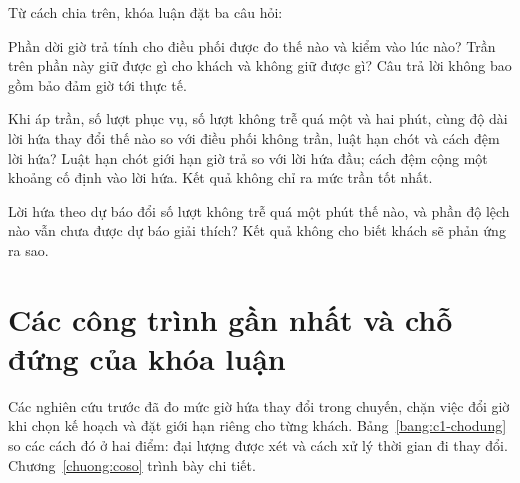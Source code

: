 Từ cách chia trên, khóa luận đặt ba câu hỏi:
\begin{description}[leftmargin=1.15cm,style=nextline,itemsep=3pt]
\item[CH1.] Phần dời giờ trả tính cho điều phối được đo thế nào và kiểm vào lúc nào? Trần trên phần này giữ
được gì cho khách và không giữ được gì? Câu trả lời không bao gồm bảo đảm giờ tới thực tế.
\item[CH2.] Khi áp trần, số lượt phục vụ, số lượt không trễ quá một và hai phút, cùng độ dài lời hứa thay đổi
thế nào so với điều phối không trần, luật hạn chót và cách đệm lời hứa? Luật hạn chót giới hạn giờ trả so với
lời hứa đầu; cách đệm cộng một khoảng cố định vào lời hứa. Kết quả không chỉ ra mức trần tốt nhất.
\item[CH3.] Lời hứa theo dự báo đổi số lượt không trễ quá một phút thế nào, và phần độ lệch nào vẫn chưa được
dự báo giải thích? Kết quả không cho biết khách sẽ phản ứng ra sao.
\end{description}

\section{Các công trình gần nhất và chỗ đứng của khóa luận}
\label{muc:c1-lienquan}

Các nghiên cứu trước đã đo mức giờ hứa thay đổi trong chuyến, chặn việc đổi giờ khi chọn kế hoạch và đặt
giới hạn riêng cho từng khách. Bảng~\ref{bang:c1-chodung} so các cách đó ở hai điểm: đại lượng được xét và cách
xử lý thời gian đi thay đổi. Chương~\ref{chuong:coso} trình bày chi tiết.

